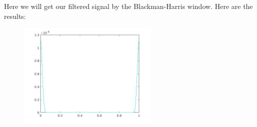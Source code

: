 \documentclass[a4paper,11pt]{article}
\begin{document}
Here we will get our filtered signal by the Blackman-Harris window. Here are the results:

\begin{figure}[!hp]
    \begin{center}
      \includegraphics[width=0.6\textwidth]{images/lab2_47.jpg}
    \end{center}
\end{figure}

\newpage
\end{document}
